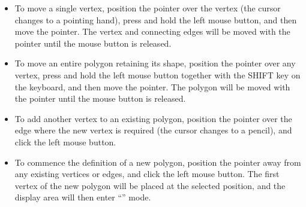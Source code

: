 \begin{itemize}

\item To move a single vertex, position the pointer over the vertex (the
cursor changes to a pointing hand), press and hold the left mouse button,
and then move the pointer. The vertex and connecting edges will be moved
with the pointer until the mouse button is released.

\item To move an entire polygon retaining its shape, position the pointer
over any vertex, press and hold the left mouse button together with the
SHIFT key on the keyboard, and then move the pointer. The polygon will be
moved with the pointer until the mouse button is released.

\item To add another vertex to an existing polygon, position the pointer
over the edge where the new vertex is required (the cursor changes to a
pencil), and click the left mouse button.

\item To commence the definition of a new polygon, position the pointer
away from any existing vertices or edges, and click the left mouse button.
The first vertex of the new polygon will be placed at the selected
position, and the display area will then enter ``'' mode.

\end{itemize}


